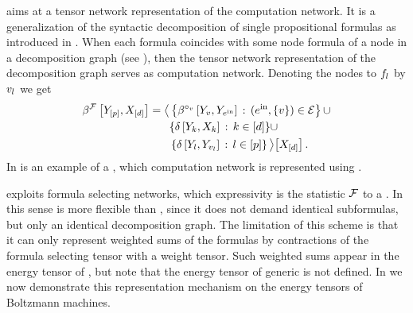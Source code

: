 \DecompositionSparsity{} aims at a tensor network representation of the computation network.
It is a generalization of the syntactic decomposition of single propositional formulas as introduced in .
When each formula coincides with some node formula of a node in a decomposition graph (see ), then the tensor network representation of the decomposition graph serves as computation network.
Denoting the nodes to $f_{l}$ by $v_l$ we get
\begin{align*}
    \beta^{\mathcal{F}}\left[Y_{[p]},X_{[d]}\right] =
    \big\langle 
        &\left\{
        \beta^{\circ_{v}}\left[Y_{v},Y_{e^{\mathrm{in}}}\right] \,:\, (e^{\mathrm{in}},\{v\})\in\mathcal{E}
        \right\} \cup \\
        & \{\delta\left[Y_{k},X_{k}\right] \,:\, k\in[d]\} \cup \\
        &\left\{
        \delta\left[Y_{l},Y_{v_{l}}\right] \,:\, l\in[p]
        \right\}
     \big\rangle \big[ X_{[d]} \big] \, .
\end{align*}
In  is an example of a \HybridLogicNetwork{}, which computation network is represented using \decompositionSparsity{}.

\subsect{\SelectionSparsity{}}\label{sec:selectionSparsityHLN}

\SelectionSparsity{} exploits formula selecting networks, which expressivity is the statistic $\mathcal{F}$ to a \HybridLogicNetwork{}.
In this sense \selectionSparsity{} is more flexible than \DecompositionSparsity{}, since it does not demand identical subformulas, but only an identical decomposition graph.
The limitation of this scheme is that it can only represent weighted sums of the formulas by contractions of the formula selecting tensor with a weight tensor.
Such weighted sums appear in the energy tensor of \MarkovLogicNetworks{}, but note that the energy tensor of generic \HybridLogicNetworks{} is not defined.
In  we now demonstrate this representation mechanism on the energy tensors of Boltzmann machines.

